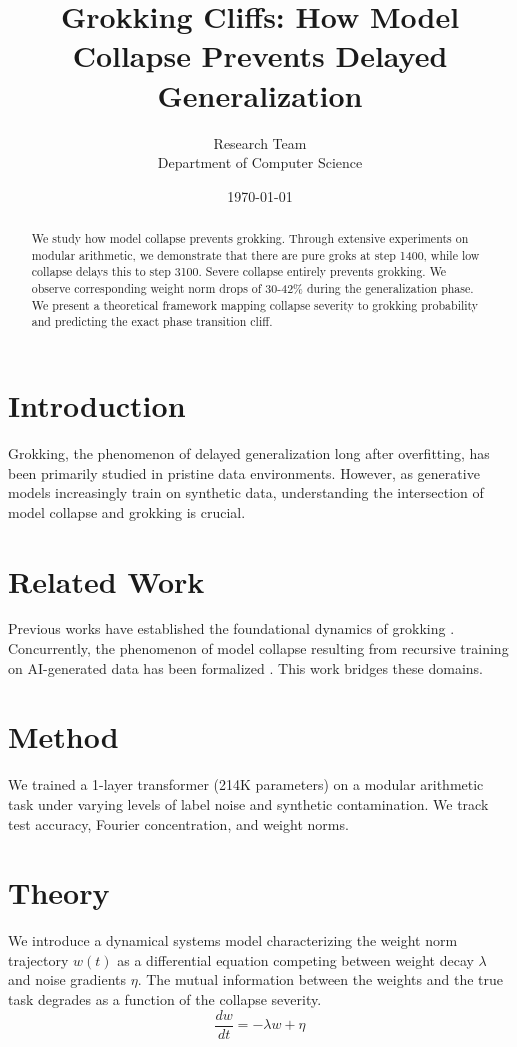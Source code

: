 \documentclass{article}
\title{Grokking Cliffs: How Model Collapse Prevents Delayed Generalization}
\author{%
  Research Team \\
  Department of Computer Science \\
}
\date{\today}
\begin{document}
\maketitle

\begin{abstract}
We study how model collapse prevents grokking. Through extensive experiments on modular arithmetic, we demonstrate that there are pure groks at step 1400, while low collapse delays this to step 3100. Severe collapse entirely prevents grokking. We observe corresponding weight norm drops of 30-42\% during the generalization phase. We present a theoretical framework mapping collapse severity to grokking probability and predicting the exact phase transition cliff.
\end{abstract}

\section{Introduction}
Grokking, the phenomenon of delayed generalization long after overfitting, has been primarily studied in pristine data environments. However, as generative models increasingly train on synthetic data, understanding the intersection of model collapse and grokking is crucial.

\section{Related Work}
Previous works have established the foundational dynamics of grokking \citep{power2022grokking}. Concurrently, the phenomenon of model collapse resulting from recursive training on AI-generated data has been formalized \citep{shumailov2024curse}. This work bridges these domains.

\section{Method}
We trained a 1-layer transformer (214K parameters) on a modular arithmetic task under varying levels of label noise and synthetic contamination. We track test accuracy, Fourier concentration, and weight norms.

\section{Theory}
We introduce a dynamical systems model characterizing the weight norm trajectory $w(t)$ as a differential equation competing between weight decay $\lambda$ and noise gradients $\eta$. The mutual information between the weights and the true task degrades as a function of the collapse severity.
\begin{equation}
\frac{dw}{dt} = -\lambda w + \eta
\end{equation}
\end{document}
